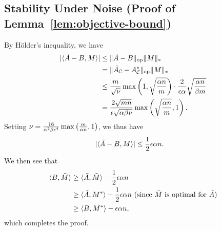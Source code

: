 \subsection{Stability Under Noise (Proof of Lemma~\ref{lem:objective-bound})}
\label{sec:objective-bound-proof}

By H\"{o}lder's inequality, we have 
\begin{align}
|\langle \A-\Aa, M \rangle| &\leq \|\A-\Aa\|_{\op}\|M\|_* \\
 &= \|\A_{\sC}-\Aavg_{\sC}\|_{\op}\|M\|_* \\
 &\leq \frac{m}{\sqrt{\fac}}\max\p{1, \sqrt{\frac{\alpha n}{m}}} \cdot \frac{2}{\epsilon\alpha}\sqrt{\frac{\alpha n}{\beta m}} \\
 &= \frac{2\sqrt{mn}}{\epsilon\sqrt{\alpha\beta\fac}}\max\p{\sqrt{\frac{\alpha n}{m}}, 1}. %
\end{align}
Setting $\nu = \frac{16}{\alpha^2\beta\epsilon^4}\max\left( \frac{m}{\alpha n}, 1 \right)$, 
we thus have
\begin{align}
|\langle \tilde{A}-B, M \rangle| &\leq \frac{1}{2}\epsilon \alpha n.
\end{align}
We then see that
\begin{align}
\langle B, \tilde{M} \rangle  &\geq \langle \tilde{A}, \tilde{M} \rangle - \frac{1}{2}\epsilon \alpha n \\
 &\geq \langle \tilde{A}, M^* \rangle - \frac{1}{2} \epsilon \alpha n \text{ (since $\tilde{M}$ is optimal for $\tilde{A}$)} \\
 &\geq \langle B, M^* \rangle - \epsilon \alpha n,
\end{align}
which completes the proof.


